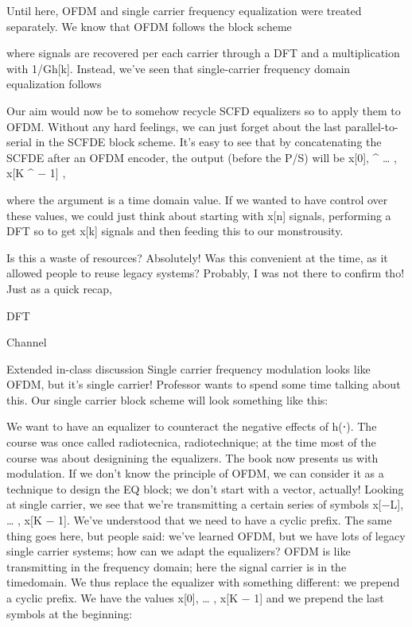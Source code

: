 {Until here, OFDM and single carrier frequency equalization were treated separately.
We know that OFDM follows the block scheme

where signals are recovered per each carrier through a DFT and a multiplication with 1/\sqrt Gh[k].
Instead, we've seen that single-carrier frequency domain equalization follows

Our aim would now be to somehow recycle SCFD equalizers so to apply them to OFDM.
Without any hard feelings, we can just forget about the last parallel-to-serial in the SCFDE block scheme.
It's easy to see that by concatenating the SCFDE after an OFDM encoder, the output
(before the P/S) will be x[0],
^
… , x[K
^
− 1] ,

where the argument is a time domain value. If we wanted to have control over these values, we could just think about starting with x[n] signals, performing a DFT so to get x[k] signals and then feeding this to our monstrousity.

Is this a waste of resources? Absolutely! Was this convenient at the time, as it allowed people to reuse legacy systems? Probably, I was not there to confirm tho!
Just as a quick recap,

DFT

Channel

Extended in-class discussion Single carrier frequency modulation looks like OFDM, but it's single carrier! Professor wants to spend some time talking about this.
Our single carrier block scheme will look something like this:

We want to have an equalizer to counteract the negative effects of h(⋅).
The course was once called radiotecnica, radiotechnique; at the time most of the course was about designining the equalizers.
The book now presents us with modulation.
If we don't know the principle of OFDM, we can consider it as a technique to design the EQ block; we don't start with a vector, actually!
Looking at single carrier, we see that we're transmitting a certain series of symbols x[−L], … , x[K − 1].
We've understood that we need to have a cyclic prefix.
The same thing goes here, but people said: we've learned OFDM, but we have lots of legacy single carrier systems; how can we adapt the equalizers?
OFDM is like transmitting in the frequency domain; here the signal carrier is in the timedomain. We thus replace the equalizer with something different: we prepend a cyclic prefix.
We have the values x[0], … , x[K − 1] and we prepend the last symbols at the beginning:

}
